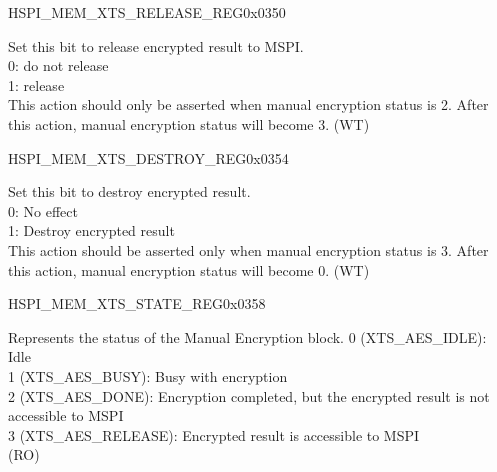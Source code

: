 \begin{register}{H}{SPI\_MEM\_XTS\_RELEASE\_REG}{0x0350}\label{regdesc:SPIMEMXTSRELEASEREG}
%
%
\regnewline%
\begin{regdesc}\begin{reglist}
\label{fielddesc:SPIMEMXTSRELEASE}\item [SPI\_MEM\_XTS\_RELEASE] Set this bit to release encrypted result to MSPI. \\
0: do not release\\
1: release\\
This action should only be asserted when manual encryption status is 2. After this action, manual encryption status will become 3. (WT)
\end{reglist}\end{regdesc}
\end{register}


\begin{register}{H}{SPI\_MEM\_XTS\_DESTROY\_REG}{0x0354}\label{regdesc:SPIMEMXTSDESTROYREG}
%
%
\regnewline%
\begin{regdesc}\begin{reglist}
\label{fielddesc:SPIMEMXTSDESTROY}\item [SPI\_MEM\_XTS\_DESTROY] Set this bit to destroy encrypted result. \\
0: No effect\\
1: Destroy encrypted result\\
This action should be asserted only when manual encryption status is 3. After this action, manual encryption status will become 0. (WT)
\end{reglist}\end{regdesc}
\end{register}


\begin{register}{H}{SPI\_MEM\_XTS\_STATE\_REG}{0x0358}\label{regdesc:SPIMEMXTSSTATEREG}
%
%
\regnewline%
\begin{regdesc}\begin{reglist}
\label{fielddesc:SPIMEMXTSSTATE}\item [SPI\_MEM\_XTS\_STATE]
Represents the status of the Manual Encryption block.
0 (XTS\_AES\_IDLE): Idle\\
1 (XTS\_AES\_BUSY): Busy with encryption\\
2 (XTS\_AES\_DONE): Encryption completed, but the encrypted result is not accessible to MSPI\\
3 (XTS\_AES\_RELEASE): Encrypted result is accessible to MSPI\\
(RO)
\end{reglist}\end{regdesc}
\end{register}

